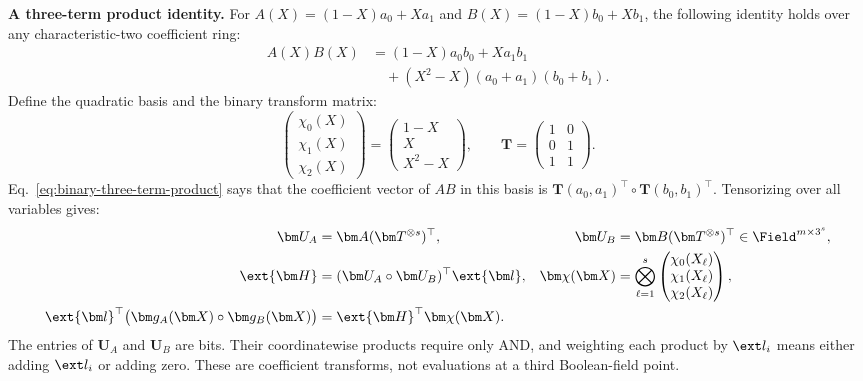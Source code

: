 \smallskip\noindent\textbf{A three-term product identity.}
For \(A(X)=(1-X)a_0+Xa_1\) and
\(B(X)=(1-X)b_0+Xb_1\), the following identity holds over any
characteristic-two coefficient ring:
\begin{equation}
\begin{aligned}
    A(X)B(X)
      &=(1-X)a_0b_0+Xa_1b_1\\
      &\quad +(X^2-X)(a_0+a_1)(b_0+b_1).
\end{aligned}
\label{eq:binary-three-term-product}
\end{equation}
Define the quadratic basis and the binary transform matrix:
\[
    \begin{pmatrix}\chi_0(X)\\\chi_1(X)\\\chi_2(X)\end{pmatrix}
       =\begin{pmatrix}1-X\\X\\X^2-X\end{pmatrix},
    \qquad
    \bm T=\begin{pmatrix}1&0\\0&1\\1&1\end{pmatrix}.
\]
Eq.~\eqref{eq:binary-three-term-product} says that the
coefficient vector of \(A B\) in this basis is
\(\bm T(a_0,a_1)^\top\circ\bm T(b_0,b_1)^\top\).
Tensorizing over all variables gives:
\begin{equation}
\begin{aligned}
    \bm U_A&=\bm A(\bm T^{\otimes s})^{\top},
    &\bm U_B&=\bm B(\bm T^{\otimes s})^{\top}
        \in\Field^{m\times3^s},\\
    \ext{\bm H}&=(\bm U_A\circ\bm U_B)^{\top}\ext{\bm l},
    &\bm\chi(\bm X)&=\bigotimes_{\ell=1}^s
        \begin{pmatrix}
          \chi_0(X_\ell)\\\chi_1(X_\ell)\\\chi_2(X_\ell)
        \end{pmatrix},\\
    \ext{\bm l}^{\top}
        \bigl(\bm g_A(\bm X)\circ\bm g_B(\bm X)\bigr)
      &=\ext{\bm H}^{\top}\bm\chi(\bm X).
\end{aligned}
\label{eq:binary-tensor-product}
\end{equation}
The entries of \(\bm U_A\) and \(\bm U_B\) are bits.
Their coordinatewise products require only AND, and weighting
each product by \(\ext l_i\) means either adding \(\ext l_i\)
or adding zero. These are coefficient transforms, not evaluations
at a third Boolean-field point.

